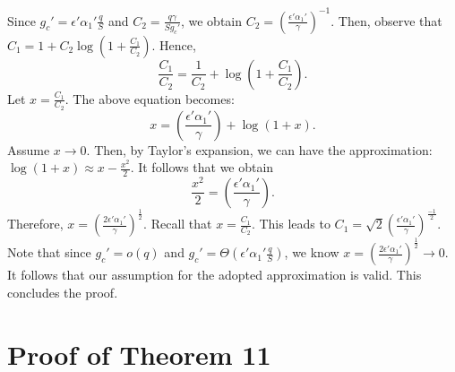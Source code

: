 \documentclass[journal,draftclsnofoot,onecolumn,12pt,twoside]{IEEEtran}
\begin{document}
Since $g_c'=\epsilon'\alpha_1'\frac{q}{S}$ and $C_2=\frac{q\gamma}{Sg_c'}$, we obtain $C_2=\left(\frac{\epsilon'\alpha_1'}{\gamma}\right)^{-1}$. Then, observe that $C_1=1+C_2\log\left(1+\frac{C_1}{C_2}\right)$. Hence, 
\begin{equation}
\frac{C_1}{C_2}=\frac{1}{C_2}+\log\left(1+\frac{C_1}{C_2}\right).
\end{equation}
Let $x=\frac{C_1}{C_2}$. The above equation becomes:
\begin{equation}
x=\left(\frac{\epsilon'\alpha_1'}{\gamma}\right)+\log(1+x).
\end{equation}
Assume $x\to 0$. Then, by Taylor's expansion, we can have the approximation: $\log(1+x)\approx x-\frac{x^2}{2}$. It follows that we obtain
\begin{equation}
\frac{x^2}{2}=\left(\frac{\epsilon'\alpha_1'}{\gamma}\right).
\end{equation}
Therefore, $x=\left(\frac{2\epsilon'\alpha_1'}{\gamma}\right)^{\frac{1}{2}}$.
Recall that $x=\frac{C_1}{C_2}$. This leads to $C_1=\sqrt{2}\left(\frac{\epsilon'\alpha_1'}{\gamma}\right)^{\frac{-1}{2}}$. Note that since $g_c'=o(q)$ and $g_c'=\Theta\left(\epsilon'\alpha_1'\frac{q}{S}\right)$, we know $x=\left(\frac{2\epsilon'\alpha_1'}{\gamma}\right)^{\frac{1}{2}}\to 0$. It follows that our assumption for the adopted approximation is valid. This concludes the proof.

\section{Proof of Theorem 11}

\label{App:ProofThm11}
\end{document}
